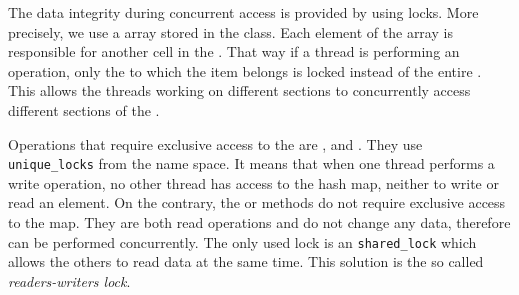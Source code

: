         
        The data integrity during concurrent access is provided by using locks. 
        More precisely, we use a \locks array stored in the \NvmHashMap class.
        Each element of the array is responsible for another cell in the \internalHashMap.
        That way if a thread is performing an operation, only the \internalHashMap to which the item belongs is locked instead of the entire \NvmHashMap. 
        This allows the threads working on different sections to concurrently access different sections of the \NvmHashMap.  
        
        Operations that require exclusive access to the \internalHashMap are \insertMethod, \removeMethod and \expandMethod.
        They use \texttt{unique\_locks} \cite{UniqueLock} from the \std name space.
        It means that when one thread performs a write operation, no other thread has access to the hash map, neither to write or read an element. 
        On the contrary, the \getMethod or \iterateMethod methods do not require exclusive access to the map. 
        They are both read operations and do not change any data, therefore can be performed concurrently.
        The only used lock is an \std \texttt{shared\_lock} \cite{SharedLock} which allows the others to read data at the same time. 
        This solution is the so called \textit{readers-writers lock}. 
        
